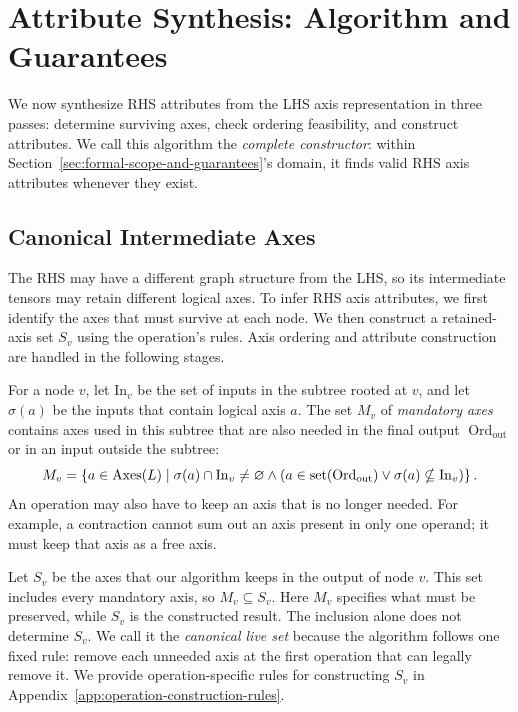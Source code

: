 \section{Attribute Synthesis: Algorithm and Guarantees}
\label{sec:attribute-synthesis-algorithm-and-guarantees}
We now synthesize RHS attributes from the LHS axis representation in three
passes: determine surviving axes, check ordering feasibility, and construct
attributes. We call this algorithm the \emph{complete constructor}: within
Section~\ref{sec:formal-scope-and-guarantees}'s domain, it finds valid RHS axis attributes
whenever they exist.

\subsection{Canonical Intermediate Axes}
\label{sec:canonical-intermediate-axes}
The RHS may have a different graph structure from the LHS, so its
intermediate tensors may retain different logical axes. To infer RHS axis
attributes, we first identify the axes that must survive at each node.
We then construct a retained-axis set $S_v$ using the operation's rules.
Axis ordering and attribute construction are handled in the following stages.

For a node $v$, let $\mathrm{In}_v$ be the set of inputs in the subtree rooted at $v$,
and let
$\sigma(a)$ be the inputs that contain logical axis $a$. The set $M_v$ of
\emph{mandatory axes} contains axes used in this subtree that are also needed in the
final output $\operatorname{Ord}_{\mathrm{out}}$ or in an input outside the subtree:
\begin{equation}
 M_v=\left\{a\in\operatorname{Axes}(L)\;\middle|\;
 \sigma(a)\cap \mathrm{In}_v\ne\varnothing
 \land (a\in\operatorname{set}(\operatorname{Ord}_{\mathrm{out}})\lor\sigma(a)\nsubseteq \mathrm{In}_v)
 \right\}.
 \label{eq:mandatory-axes}
\end{equation}
An operation may also have to keep an axis that is no longer needed.
For example, a contraction cannot sum out an axis present in only one
operand; it must keep that axis as a free axis.

Let $S_v$ be the axes that our algorithm keeps in the output of node
$v$.
This set includes every mandatory axis, so $M_v\subseteq S_v$.
Here $M_v$ specifies what must be preserved, while $S_v$ is the constructed
result. The inclusion alone does not determine $S_v$.
We call it the \emph{canonical live set} because the algorithm follows one
fixed rule: remove each unneeded axis at the first operation that can
legally remove it. We provide operation-specific rules for constructing
$S_v$ in Appendix~\ref{app:operation-construction-rules}.


